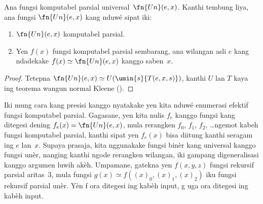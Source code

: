 \documentclass[../../../include/open-logic-section]{subfiles}
\begin{document}

\begin{thm}
Ana fungsi komputabel parsial universal~$\fn{Un}(e,x)$.
Kanthi tembung liya, ana fungsi $\fn{Un}(e,x)$
kang nduwé sipat iki:
\begin{enumerate}
\item $\fn{Un}(e,x)$ komputabel parsial.
\item Yen $f(x)$ fungsi komputabel parsial sembarang,
  ana wilangan asli $e$ kang ndadekake
  $f(x) \simeq \fn{Un}(e,x)$ kanggo saben~$x$.
\end{enumerate}
\end{thm}

\begin{proof}
Tetepna $\fn{Un}(e,x) \simeq U(\umin{s}{T(e,x,s)})$,
kanthi $U$ lan $T$ kaya ing teorema wangun normal
Kleene ().
\end{proof}

\begin{explain}
Iki mung cara kang presisi kanggo nyatakake
yen kita nduwé enumerasi efektif fungsi
komputabel parsial. Gagasane, yen kita nulis
$f_e$ kanggo fungsi kang ditegesi dening
$f_e(x) = \fn{Un}(e,x)$, mula rerangken
$f_0$, $f_1$, $f_2$, \dots ngemot kabeh
fungsi komputabel parsial, kanthi sipat yen
$f_e(x)$ bisa diitung kanthi seragam ing
$e$ lan~$x$. Supaya prasaja, kita nggunakake
fungsi binèr kang universal kanggo fungsi
unèr, nanging kanthi ngode rerangken wilangan,
iki gampang digeneralisasi kanggo argumen
luwih akèh. Umpamane, gatekna yen
$f(x,y,z)$ fungsi rekursif parsial aritas~$3$,
mula fungsi $g(x) \simeq f((x)_0, (x)_1, (x)_2)$
%
iku fungsi rekursif parsial unèr. Yèn f ora ditegesi ing kabèh input, g uga ora ditegesi ing kabèh input.
\end{explain}
\end{document}
